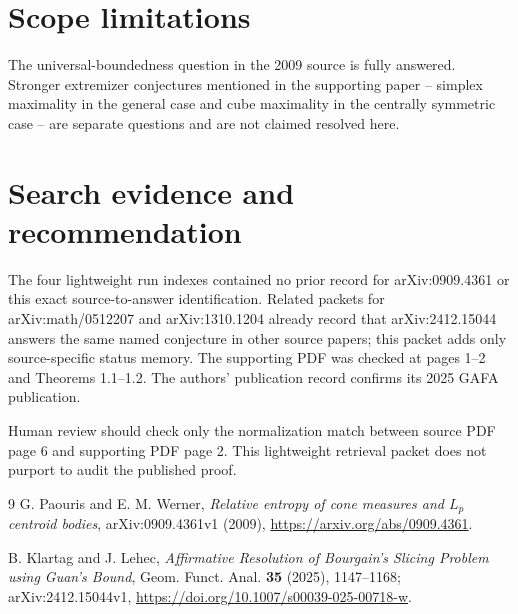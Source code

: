 \documentclass[11pt]{article}
\begin{document}
\section*{Scope limitations}

The universal-boundedness question in the 2009 source is fully answered.
Stronger extremizer conjectures mentioned in the supporting paper -- simplex
maximality in the general case and cube maximality in the centrally symmetric
case -- are separate questions and are not claimed resolved here.

\section*{Search evidence and recommendation}

The four lightweight run indexes contained no prior record for arXiv:0909.4361
or this exact source-to-answer identification. Related packets for
arXiv:math/0512207 and arXiv:1310.1204 already record that arXiv:2412.15044
answers the same named conjecture in other source papers; this packet adds
only source-specific status memory. The supporting PDF was checked at pages
1--2 and Theorems 1.1--1.2. The authors' publication record confirms its 2025
GAFA publication.

Human review should check only the normalization match between source PDF
page 6 and supporting PDF page 2. This lightweight retrieval packet does not
purport to audit the published proof.

\begin{thebibliography}{9}
G. Paouris and E. M. Werner,
\emph{Relative entropy of cone measures and $L_p$ centroid bodies},
arXiv:0909.4361v1 (2009),
\url{https://arxiv.org/abs/0909.4361}.

B. Klartag and J. Lehec,
\emph{Affirmative Resolution of Bourgain's Slicing Problem using Guan's Bound},
Geom. Funct. Anal. \textbf{35} (2025), 1147--1168;
arXiv:2412.15044v1,
\url{https://doi.org/10.1007/s00039-025-00718-w}.
\end{thebibliography}
\end{document}
